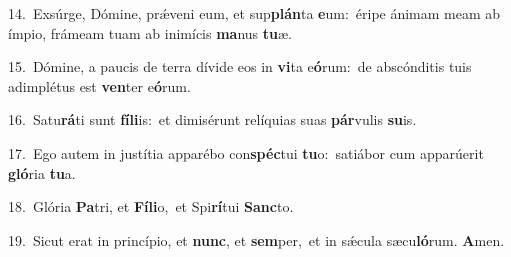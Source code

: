 {\numbfont\textcolor{\numbcolor}{14.}}~Exsúrge, Dómine, prǽveni eum, et sup\-\textbf{plán}\-ta \textbf{e}\-um:~\star éripe ánimam meam ab ímpio, frámeam tuam ab inimícis \textbf{ma}\-nus \textbf{tu}\-æ.\par
{\numbfont\textcolor{\numbcolor}{15.}}~Dómine, a paucis de terra dívide eos in \textbf{vi}\-ta e\-\textbf{ó}\-rum:~\star de abscónditis tuis adimplétus est \textbf{ven}\-ter e\-\textbf{ó}\-rum.\par
{\numbfont\textcolor{\numbcolor}{16.}}~Satu\-\textbf{rá}\-ti sunt \textbf{fí}\-\textbf{li}is:~\star et dimisérunt relíquias suas \textbf{pár}\-vulis \textbf{su}\-is.\par
{\numbfont\textcolor{\numbcolor}{17.}}~Ego autem in justítia apparébo con\-\textbf{spéc}\-tui \textbf{tu}\-o:~\star satiábor cum apparúerit \textbf{gló}\-ria \textbf{tu}\-a.\par
{\numbfont\textcolor{\numbcolor}{18.}}~Glória \textbf{Pa}\-tri, et \textbf{Fí}\-\textbf{li}o,~\star et Spi\-\textbf{rí}\-tui \textbf{Sanc}\-to.\par
{\numbfont\textcolor{\numbcolor}{19.}}~Sicut erat in princípio, et \textbf{nunc}\-, et \textbf{sem}\-per,~\star et in sǽcula sæcu\-\textbf{ló}\-rum. \textbf{A}\-men.\par
